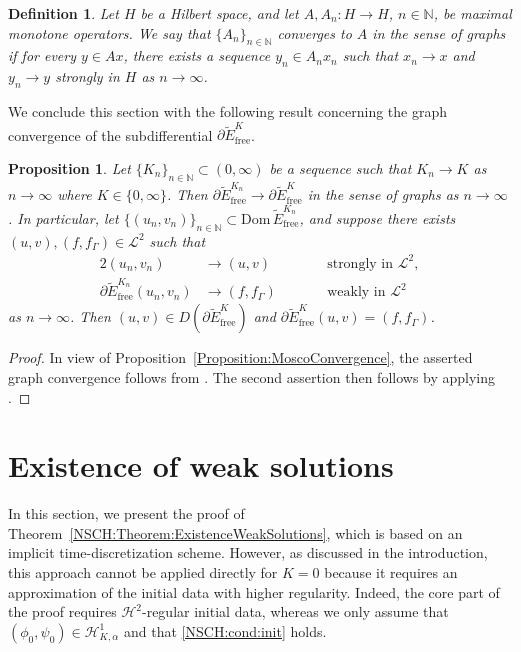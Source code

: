 \documentclass[11pt,reqno]{amsart}
\newtheorem{definition}[theorem]{Definition}
\newtheorem{proposition}[theorem]{Proposition}
\theoremstyle{remark}
\numberwithin{equation}{section}
\newcommand{\N}{\mathbb N}
\newcommand{\Ga}{\Gamma}
\newcommand{\free}{\mathrm{free}}
\begin{document}
\begin{definition}
    Let $H$ be a Hilbert space, and let $A, A_n:H\rightarrow H$, $n\in\N$, be maximal monotone operators. We say that  $\{A_n\}_{n\in\N}$ converges to $A$ in the sense of graphs if for every $y\in Ax$, there exists a sequence $y_n\in A_nx_n$ such that $x_n\rightarrow x$ and $y_n\rightarrow y$ strongly in $H$ as $n\rightarrow\infty$.
\end{definition}

We conclude this section with the following result concerning the graph convergence of the subdifferential $\partial\widetilde E_\free^K$.

\begin{proposition}\label{Prelim:Proposition:GraphConvergence}
    Let $\{K_n\}_{n\in\N}\subset(0,\infty)$ be a sequence such that $K_n\rightarrow K$ as $n\rightarrow\infty$ where $K\in\{0,\infty\}$. Then $\partial\widetilde E_\free^{K_n}\rightarrow\partial\widetilde E_\free^K$ in the sense of graphs as $n\rightarrow\infty$.
    In particular, let $\{(u_n,v_n)\}_{n\in\N}\subset \mathrm{Dom}\, \widetilde E_\free^{K_n}$, and suppose there exists $(u,v), (f,f_\Ga)\in\mathcal{L}^2$ such that
    \begin{alignat*}{2}
        (u_n,v_n)&\rightarrow (u,v) &&\qquad\text{strongly in~}\mathcal{L}^2, \\
        \partial\widetilde E_\free^{K_n}(u_n,v_n) &\rightarrow (f,f_\Ga) &&\qquad\text{weakly in~}\mathcal{L}^2
    \end{alignat*}
    as $n\rightarrow\infty$. Then $(u,v)\in D(\partial\widetilde E_\free^K)$ and $\partial\widetilde E_\free^K(u,v) = (f,f_\Ga)$.
\end{proposition}

\begin{proof}
    In view of Proposition~\ref{Proposition:MoscoConvergence}, the asserted graph convergence follows from \cite[Section~3.8, Theorem~3.66]{Attouch1984}. The second assertion then follows by applying \cite[Section~3.7, Proposition~3.59]{Attouch1984}.
\end{proof}

\section{Existence of weak solutions}
\label{Section:Existence}

In this section, we present the proof of Theorem~\ref{NSCH:Theorem:ExistenceWeakSolutions}, which is based on an implicit time-discretization scheme. However, as discussed in the introduction, this approach cannot be applied directly for $K = 0$ because it requires an approximation of the initial data with higher regularity. Indeed, the core part of the proof requires $\mathcal{H}^2$-regular initial data, whereas we only assume that $(\phi_0,\psi_0)\in\mathcal{H}^1_{K,\alpha}$ and that \eqref{NSCH:cond:init} holds.
\end{document}
